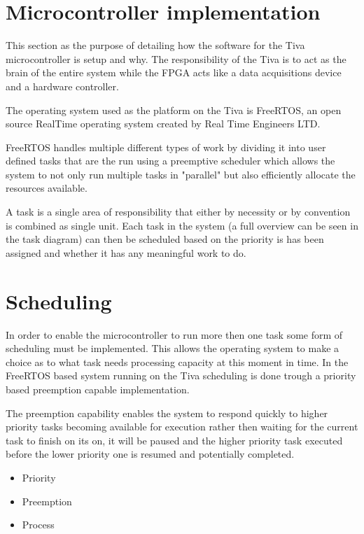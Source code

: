 \documentclass[../../../main]{subfiles}
\begin{document}
\section*{Microcontroller implementation}

This section as the purpose of detailing how the software for the Tiva microcontroller is setup and why. The responsibility of the Tiva is to act as the brain of the entire system while the FPGA acts like a data acquisitions device and a hardware controller. 

The operating system used as the platform on the Tiva is FreeRTOS, an open source RealTime operating system created by Real Time Engineers LTD.

FreeRTOS handles multiple different types of work by dividing it into user defined tasks that are the run using a preemptive scheduler which allows the system to not only run multiple tasks in "parallel" but also efficiently allocate the resources available.


A task is a single area of responsibility that either by necessity or by convention is combined as single unit. Each task in the system (a full overview can be seen in the task diagram) can then be scheduled based on the priority is has been assigned and whether it has any meaningful work to do. 


\section*{Scheduling}

In order to enable the microcontroller to run more then one task some form of scheduling must be implemented. This allows the operating system to make a choice as to what task needs processing capacity at this moment in time. In the FreeRTOS based system running on the Tiva scheduling is done trough a priority based preemption capable implementation.

The preemption capability enables the system to respond quickly to higher priority tasks becoming available for execution rather then waiting for the current task to finish on its on, it will be paused and the higher priority task executed before the lower priority one is resumed and potentially completed.


\begin{itemize}
    \item Priority
    \item Preemption
    \item Process
\end{itemize}
\end{document}
